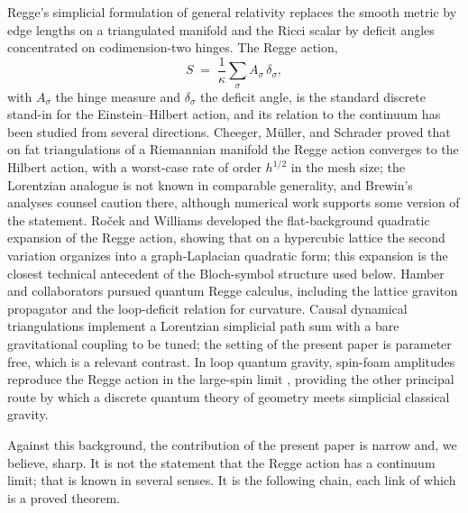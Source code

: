 \documentclass[11pt]{article}
\theoremstyle{definition}
\theoremstyle{remark}
\begin{document}
Regge's simplicial formulation of general relativity \cite{Regge} replaces the smooth metric by edge lengths on a triangulated manifold and the Ricci scalar by deficit angles concentrated on codimension-two hinges. The Regge action,
\begin{equation}
S \;=\; \frac{1}{\kappa}\sum_{\sigma} A_{\sigma}\,\delta_{\sigma},
\label{eq:regge}
\end{equation}
with $A_\sigma$ the hinge measure and $\delta_\sigma$ the deficit angle, is the standard discrete stand-in for the Einstein--Hilbert action, and its relation to the continuum has been studied from several directions. Cheeger, M\"uller, and Schrader \cite{CMS} proved that on fat triangulations of a Riemannian manifold the Regge action converges to the Hilbert action, with a worst-case rate of order $h^{1/2}$ in the mesh size; the Lorentzian analogue is not known in comparable generality, and Brewin's analyses \cite{Brewin} counsel caution there, although numerical work supports some version of the statement. Ro\v{c}ek and Williams \cite{RocekWilliams} developed the flat-background quadratic expansion of the Regge action, showing that on a hypercubic lattice the second variation organizes into a graph-Laplacian quadratic form; this expansion is the closest technical antecedent of the Bloch-symbol structure used below. Hamber and collaborators \cite{Hamber, HamberWilliams} pursued quantum Regge calculus, including the lattice graviton propagator and the loop-deficit relation for curvature. Causal dynamical triangulations \cite{AJL, Loll} implement a Lorentzian simplicial path sum with a bare gravitational coupling to be tuned; the setting of the present paper is parameter free, which is a relevant contrast. In loop quantum gravity, spin-foam amplitudes reproduce the Regge action in the large-spin limit \cite{BarrettWilliams, ConradyFreidel, BianchiModesto}, providing the other principal route by which a discrete quantum theory of geometry meets simplicial classical gravity.

Against this background, the contribution of the present paper is narrow and, we believe, sharp. It is not the statement that the Regge action has a continuum limit; that is known in several senses. It is the following chain, each link of which is a proved theorem.
\end{document}
